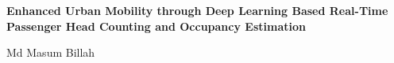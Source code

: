 \documentclass[12pt,a4paper]{report}
\begin{document}
\setcounter{page}{1}

\begin{center}
    {\fontsize{18}{22}\selectfont\bfseries
    Enhanced Urban Mobility through Deep Learning Based Real-Time Passenger Head Counting and Occupancy Estimation\par}

    \vspace{6pt}

    {\fontsize{12}{15}\selectfont
    Md Masum Billah\par}

    \vspace{18pt}
\end{center}

{
    \let\clearpage\relax
    
}

\setcounter{page}{1}
	

	

	

	

	

% 
% 

\begingroup
\let\clearpage\relax
\renewcommand{\bibname}{References}


\endgroup
\end{document}

